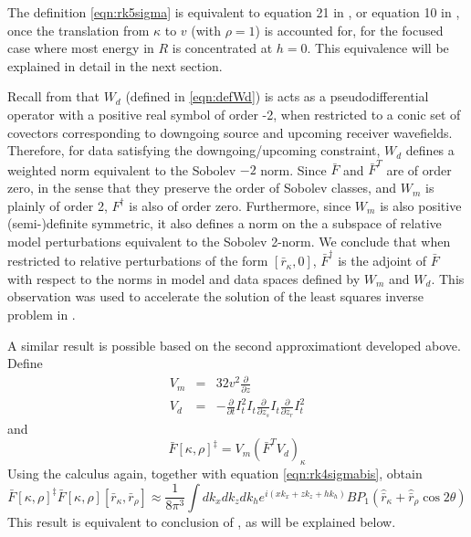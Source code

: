 The definition \ref{eqn:rk5sigma} is equivalent to equation 21 in \cite[]{HouSymes:15}, or
equation 10 in \cite[]{HouSymes:17}, once the translation from
$\kappa$ to $v$ (with $\rho=1$) is accounted for, for the focused case
where most energy in $R$ is concentrated at $h=0$. This equivalence
will be explained in detail in the next section. 

Recall from \cite[]{HouSymes:15} that $W_d$ (defined in
\ref{eqn:defWd}) is acts as a pseudodifferential operator with a
positive real symbol of order -2, when restricted to a conic set of
covectors corresponding to downgoing source and upcoming receiver
wavefields. Therefore, for data satisfying the downgoing/upcoming
constraint, $W_d$ defines a weighted norm equivalent to the Sobolev
$-2$ norm. Since $\bar{F}$ and $\bar{F}^T$ are of order zero, in the
sense that they preserve the order of Sobolev classes, and $W_m$ is
plainly of order 2, $F^{\dagger}$ is also of order zero. Furthermore,
since $W_m$ is also positive (semi-)definite symmetric, it also
defines a norm on the a subspace of relative model perturbations equivalent
to the Sobolev 2-norm. We conclude that when restricted to relative
perturbations of the form $[\bar{r}_{\kappa},0]$,  $\bar{F}^{\dagger}$ is the
adjoint of $\bar{F}$ with respect to the norms in model and data
spaces defined by $W_m$ and $W_d$. This observation was used to
accelerate the solution of the least squares inverse problem in
\cite[]{HouSymes:16}.

A similar result is possible based on the second approximationt
developed above. Define 
\begin{eqnarray}
\label{eqn:defVminv}
V_m & = & 32 v^2 \frac{\partial}{\partial z} \\
\label{eqn:defVd}
V_d &=& -\frac{\partial}{\partial t}I_t^2 I_t\frac{\partial}{\partial z_s}I_t\frac{\partial}{\partial z_r}I_t^2
\end{eqnarray}
and 
\begin{equation}
\label{eqn:rk5sigmabis} 
\bar{F}[\kappa,\rho]^{\ddagger}  = V_m (\bar{F}^T V_d)_{\kappa} 
\end{equation}
Using the calculus again, together with equation \ref{eqn:rk4sigmabis}, obtain
\begin{equation}
\label{eqn:rk6sigmabis}
\bar{F}[\kappa,\rho]^{\ddagger}\bar{F}[\kappa,\rho][\bar{r}_{\kappa},\bar{r}_{\rho}]
\approx  
\frac{1}{8 \pi^3}\int dk_x dk_z dk_h e^{i(xk_{x}+zk_{z}+hk_{h})}B P_1
 (\hat{\bar{r}}_{\kappa} + \hat{\bar{r}}_{\rho} \cos 2 \theta ) 
\end{equation}
This result is equivalent to conclusion of \cite{HouSymes:17}, as will
be explained below.

